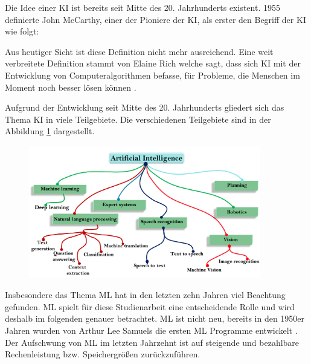 Die Idee einer \acl{KI} ist bereits seit Mitte des 20. Jahrhunderts existent. 1955 definierte John McCarthy, einer der Pioniere der \ac{KI}, als erster den Begriff der \acl{KI} wie folgt:
\begin{quote}
  \autocite[][S. 1]{ertel_grundkurs_2016}
\end{quote}\noindent
Aus heutiger Sicht ist diese Definition nicht mehr ausreichend.
Eine weit verbreitete Definition stammt von Elaine Rich welche sagt, dass sich \ac{KI} mit der Entwicklung von Computeralgorithmen befasse, für Probleme, die Menschen im Moment noch besser lösen können \autocite[vgl. ][]{rich_artificial_1983}.

Aufgrund der Entwicklung seit Mitte des 20. Jahrhunderts gliedert sich das Thema \ac{KI} in viele Teilgebiete.
Die verschiedenen Teilgebiete sind in der Abbildung \ref{fig:KI-Teilgebiete} dargestellt.
\begin{figure}[H]
    \centering
    \includegraphics[width=0.9\textwidth]{images/KI_teilgebiete.png}
    \label{fig:KI-Teilgebiete}
\end{figure}\noindent
Insbesondere das Thema \ac{ML} hat in den letzten zehn Jahren viel Beachtung gefunden. 
\ac{ML} spielt für diese Studienarbeit eine entscheidende Rolle und wird deshalb im folgenden genauer betrachtet.
\newline
\ac{ML} ist nicht neu, bereits in den 1950er Jahren wurden von Arthur Lee Samuels die ersten \ac{ML} Programme entwickelt \autocite[vgl.][S. 5]{judith_hurwitz_machine_2018}.
Der Aufschwung von \ac{ML} im letzten Jahrzehnt ist auf steigende und bezahlbare Rechenleistung bzw. Speichergrößen zurückzuführen.

